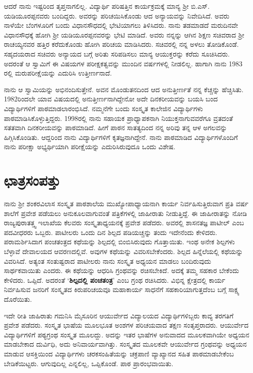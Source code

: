 {ಆದರೆ ನಾನು ಇಷ್ಟರಿಂದ ತೃಪ್ತನಾಗಲಿಲ್ಲ.  ವಿದ್ಯಾರ್ಥಿ ಪರಿಷತ್ತಿನ ಕಾರ್ಯಕ್ರಮಕ್ಕೆ ಮಾನ್ಯ ಶ್ರೀ ಬಿ.ಎಸ್. ಯಡಿಯೂರಪ್ಪನವರು ಬಂದಿದ್ದರು.  ಅವರನ್ನು ಪರಿಚಯಿಸಿಕೊಂಡು ಆದ ಅನ್ಯಾಯವನ್ನು ನಿವೇದಿಸಿದೆ.  ಅವರು ನಾಳೆಯೇ ಬೆಂಗಳೂರಿಗೆ ಬಂದು ವಿಧಾನಸೌಧದಲ್ಲಿ ಭೇಟಿಯಾಗಲು ತಿಳಿಸಿದರು.  ನಾನು ತಡಮಾಡದೆ ಮರುದಿನವೇ ವಿಧಾನಸೌಧಕ್ಕೆ ಹೋಗಿ ಶ್ರೀ ಯಡಿಯೂರಪ್ಪನವರನ್ನು ಭೇಟಿ ಮಾಡಿದೆ.  ಅವರು ನನ್ನನ್ನು ಆಗಿನ ಶಿಕ್ಷಣ ಸಚಿವರಾದ ಶ್ರೀ ರಾಚಯ್ಯನವರ ಹತ್ತಿರ ಕರೆದುಕೊಂಡು ಹೋಗಿ ಪರಿಚಯ ಮಾಡಿಸಿದರು.  ಸಚಿವರಲ್ಲಿ ನನ್ನ ಅಳಲು ತೋಡಿಕೊಂಡೆ.  ಸಹೃದಯರಾದ ಸಚಿವರು ಅನ್ಯಾಯದ ಬಗ್ಗೆ ಅರಿತು ಸರಿಪಡಿಸಲು ಮಾನ್ಯ ಆಯುಕ್ತರನ್ನು ಕರೆದು ಸೂಚಿಸಿ\-ದರು.  ಅದರಂತೆ ಆ ಸ್ವಾಮಿಗೆ ಈ ವಿಷಯಗಳ ಪರೀಕ್ಷಕತ್ವವನ್ನು ಮುಂದಿನ ವರ್ಷಗಳಲ್ಲಿ ನೀಡಲಿಲ್ಲ.  ಹಾಗಾಗಿ ನಾನು 1983 ರಲ್ಲಿ ಮರುಪರೀಕ್ಷೆಯನ್ನು ಎದುರಿಸಿ ಉತ್ತೀರ್ಣನಾದೆ.  

ನಾನು ಆ ಸ್ವಾಮಿಯನ್ನು ಅಭಿನಂದಿಸುತ್ತೇನೆ.  ಅವನ ಮೊಂಡುತನದಿಂದ ಆದ ಅನುತ್ತೀರ್ಣತೆ ನನ್ನ ಕೆಚ್ಚನ್ನು ಹೆಚ್ಚಿಸಿತು.  1982ರಿಂದಲೇ ಯಾವ ವಿಷಯದಲ್ಲಿ ಅನುತ್ತೀರ್ಣ\-ನಾಗಿದ್ದೇನೋ ಅದೇ ದಿನಕರೀಯವನ್ನು ಬಯಸಿ ಬಂದ ವಿದ್ಯಾರ್ಥಿಗಳಿಗೆ ಪಾಠ\-ಮಾಡಲಾರಂಭಿಸಿದೆ. ನಮ್ಮನೆಗೇ ಬಂದು ಸಂಸ್ಕೃತ ಕಾಲೇಜಿನ ವಿದ್ಯಾರ್ಥಿಗಳು ಪಾಠ\-ಮಾಡಿಸಿಕೊಳ್ಳುತ್ತಿದ್ದರು.  1998ರಲ್ಲಿ ನಾನು ಸಹಾಯಕ ಪ್ರಾಧ್ಯಾಪಕನಾಗಿ ನಿಯುಕ್ತನಾಗುವವರೆಗೂ ವ್ರತದಂತೆ ಸತತವಾಗಿ ದಿನಕರೀಯವನ್ನು ಪಾಠಮಾಡಿದೆ.  ಹೀಗೆ ಪಾಠನ ಸಾತತ್ಯ\-ದಿಂದ ನನ್ನ ಅರಿವು ತನ್ನ ಆಳ ಅಗಲವನ್ನು ಹಿಗ್ಗಿಸಿಕೊಂಡಿತು. ಆದ್ದರಿಂದ ನಾನು ವಿದ್ಯಾರ್ಥಿಗಳಿಗೆ ಕೃತಜ್ಞನಾಗಿದ್ದೇನೆ.  ನಾನು ಪಾಠಮಾಡಿದ ವಿದ್ಯಾರ್ಥಿ\-ಗಳೊಂದಿಗೆ ನಾನು ಪರೀಕ್ಷಾ ಅಭ್ಯರ್ಥಿಯಾಗಿ ಪರೀಕ್ಷೆಯನ್ನು ಎದುರಿಸಿರುವುದೂ ಒಂದು ವಿಶೇಷ.

\section*{ಛಾತ್ರಸಂಪತ್ತು}

ನಾನು ಶ್ರೀ ಶಂಕರವಿಲಾಸ ಸಂಸ್ಕೃತ ಪಾಠಶಾಲೆಯ ಮುಖ್ಯೋಪಾಧ್ಯಾಯನಾಗಿ ಕಾರ್ಯ ನಿರ್ವಹಿಸುತ್ತಿರುವಾಗ ಪ್ರತಿ ವರ್ಷ ಶಾಲೆಗೆ ಪ್ರವೇಶ ಪಡೆಯಲು ಅನುಕೂಲವಾಗುವಂತೆ ಪತ್ರಿಕೆಗಳಲ್ಲಿ ಜಾಹೀರಾತು ನೀಡುತ್ತಿದ್ದೆ.  ಈ ಜಾಹೀರಾತನ್ನು ನೋಡಿ ರಾಜ್ಯಪುರಾತತ್ತ್ವ ಇಲಾಖೆಯ ಕೆಲವರು ಸಂಸ್ಕೃತಾಧ್ಯಯನಕ್ಕೆ ಪ್ರವೇಶ ಪಡೆದರು.  ಅವರಲ್ಲಿ ಶಾಸನತಜ್ಞ ಪಾಟೀಲ್ ಎಂಬ ಪದವೀಧರರು ಒಬ್ಬರು.  ಪಾಟೀಲರು ಒಂದು ದಿನ ಶಿಲ್ಪದ ಪಡಿಯಚ್ಚನ್ನು ತಂದು ಇದೇನೆಂದು ಕೇಳಿದರು.  ಪರಾಮರ್ಶಿಸಿದಾಗ ಪಂಚತಂತ್ರದ ಕಥೆಯನ್ನು ಶಿಲ್ಪದಲ್ಲಿ ಬಿಂಬಿಸಿರುವುದು ಗೊತ್ತಾಯಿತು.  ಇಂಥ ಅನೇಕ ಶಿಲ್ಪಗಳು ಬೆಳ್ಳಾವೆ ದೇವಾಲಯದ ಆವರಣದಲ್ಲಿವೆ.  ಅವುಗಳ ಕಥೆಯನ್ನು ವಿವರಿಸಬೇಕೆಂದರು.  ಶಿಲ್ಪದ ಹಿನ್ನೆಲೆಯಲ್ಲಿ ಕಥೆಯನ್ನು ವಿವರಿಸಿದೆ.  ಅತ್ಯಂತ ಸಂತುಷ್ಟರಾದ ಪಾಟೀಲರು ನಾನು ಸಂಸ್ಕೃತ ಅಧ್ಯಯನ ಮಾಡಲು ಬಂದಿರುವುದು ಸಾರ್ಥಕವಾಯಿತು ಎಂದರು.  ಈ ಕಥೆಯನ್ನು ಆಧರಿಸಿ ಗ್ರಂಥವನ್ನು ರಚಿಸಬೇಕಿದೆ.  ಅದಕ್ಕೆ  ತಮ್ಮ ಸಹಕಾರ ಬೇಕೆಂದು ಕೇಳಿದರು. ಒಪ್ಪಿದೆ.  ಅದರಂತೆ  ‘\textbf{ಶಿಲ್ಪದಲ್ಲಿ ಪಂಚತಂತ್ರ}’ ಎಂಬ ಗ್ರಂಥ ರಚಿಸಿದರು. ವಿಭಿನ್ನ ಕ್ಷೇತ್ರದಲ್ಲಿ ಕಾರ್ಯ ನಿರ್ವಹಿಸುವ ಜನರಿಗೆ ಸಂಸ್ಕೃತದ ಕಿರುಪರಿಚಯವೂ ಮಹಾಕಾರ್ಯ ಸಾಧನೆಗೆ ಸಹಕಾರಿಯಾಗುತ್ತದೆಂಬ ಬಗ್ಗೆ ಸಾಕ್ಷ್ಯ ದೊರೆಯಿತು.  

ಇದೇ ರೀತಿ ಜಾಹಿರಾತು ಗಮನಿಸಿ ಮೈಸೂರಿನ ಆಯುರ್ವೇದ ವಿದ್ಯಾಲಯದ ವಿದ್ಯಾರ್ಥಿಗಳಿಬ್ಬರು ಕಾವ್ಯ ತರಗತಿಗೆ ಪ್ರವೇಶ ಪಡೆದರು.  ಸಂಸ್ಕೃತ ಭಾಷೆಯ ಮೂಲಭೂತ ಅಂಶಗಳ ಪರಿಚಯವಾದ ತಕ್ಷಣ ಸಂತೃಪ್ತರಾದರು.  ಆಯುರ್ವೇದ ವಿದ್ಯಾರ್ಥಿ\-ಗಳಿಗೆ ಪಠ್ಯಗ್ರಂಥ ಸಂಸ್ಕೃತ ಮೂಲದ್ದು.   ಅದನ್ನು ಇತರ ಭಾಷೆಗಳ ಅನುವಾದದ ಮೂಲಕವಾಗಿಯೇ ಅಧ್ಯಯನ ಮಾಡಬೇಕಾದ ದುರ್ವಿಧಿ, ಅದು ಅನಿವಾರ್ಯ\-ವಾಗಿತ್ತು. ಸಂಸ್ಕೃತದ ಮೂಲಕವೇ ಆಯುರ್ವೇದ ಗ್ರಂಥವನ್ನು ಅಧ್ಯಯನ ಮಾಡುವ ಆಸಕ್ತಿಯಿಂದ ವಿದ್ಯಾರ್ಥಿಗಳು ಚರಕಸಂಹಿತೆಯನ್ನು ಚಕ್ರಪಾಣಿ ವ್ಯಾಖ್ಯಾನದ ಸಹಿತ ಪಾಠಮಾಡಬೇಕೆಂಬ ಬೇಡಿಕೆಯಿಟ್ಟರು. ಆಗುವುದಿಲ್ಲ ಎನ್ನಲಿಲ್ಲ,  ಒಪ್ಪಿಕೊಂಡೆ.  ಪಾಠ ಪ್ರಾರಂಭ\-ವಾಯಿತು.

}
